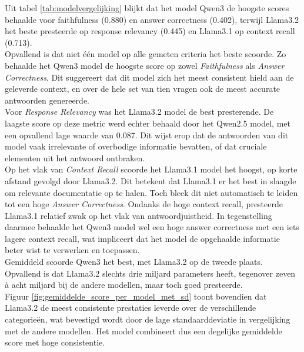 



Uit tabel \ref{tab:modelvergelijking} blijkt dat het model Qwen3 de hoogste scores behaalde voor faithfulness (0.880) en answer correctness (0.402), terwijl Llama3.2 het beste presteerde op response relevancy (0.445) en Llama3.1 op context recall (0.713). 
\\[1em]
Opvallend is dat niet één model op alle gemeten criteria het beste scoorde. Zo behaalde het Qwen3 model de hoogste score op zowel \textit{Faithfulness} als \textit{Answer Correctness}. Dit suggereert dat dit model zich het meest consistent hield aan de geleverde context, en over de hele set van tien vragen ook de meest accurate antwoorden genereerde.
\\[1em]
Voor \textit{Response Relevancy} was het Llama3.2 model de best presterende. De laagste score op deze metric werd echter behaald door het Qwen2.5 model, met een opvallend lage waarde van 0.087. Dit wijst erop dat de antwoorden van dit model vaak irrelevante of overbodige informatie bevatten, of dat cruciale elementen uit het antwoord ontbraken.
\\[1em]
Op het vlak van \textit{Context Recall} scoorde het Llama3.1 model het hoogst, op korte afstand gevolgd door Llama3.2. Dit betekent dat Llama3.1 er het best in slaagde om relevante documentatie op te halen. Toch bleek dit niet automatisch te leiden tot een hoge \textit{Answer Correctness}. Ondanks de hoge context recall, presteerde Llama3.1 relatief zwak op het vlak van antwoordjuistheid. In tegenstelling daarmee behaalde het Qwen3 model wel een hoge answer correctness met een iets lagere context recall, wat impliceert dat het model de opgehaalde informatie beter wist te verwerken en toepassen.
\\[1em]
Gemiddeld scoorde Qwen3 het best, met Llama3.2 op de tweede plaats. Opvallend is dat Llama3.2 slechts drie miljard parameters heeft, tegenover zeven à acht miljard bij de andere modellen, maar toch goed presteerde.
\\[1em]
Figuur \ref{fig:gemiddelde_score_per_model_met_sd} toont bovendien dat Llama3.2 de meest consistente prestaties leverde over de verschillende categorieën, wat bevestigd wordt door de lage standaarddeviatie in vergelijking met de andere modellen. Het model combineert dus een degelijke gemiddelde score met hoge consistentie.

